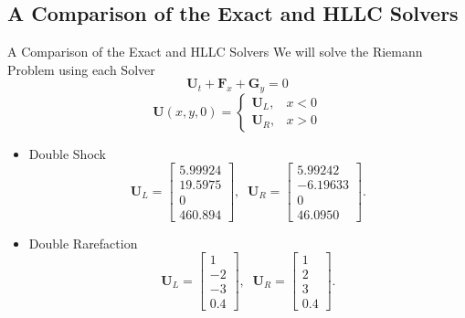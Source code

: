 \documentclass{beamer}
\newcommand{\mbf}{\mathbf}
\newcommand{\bq}{\begin{equation}}
\newcommand{\eq}{\end{equation}}
\begin{document}
\subsection{A Comparison of the Exact and HLLC Solvers}
\begin{frame}{A Comparison of the Exact and HLLC Solvers}
We will solve the Riemann Problem using each Solver
$$\mbf{U}_t+\mbf{F}_x+\mbf{G}_y=0$$
$$\mbf{U}(x,y,0)=\left\{\begin{array}{cc}\mbf{U}_L,&x<0\\ \mbf{U}_R,&x>0\end{array}\right.$$

\begin{itemize}
\item Double Shock
\bq \mbf{U}_L=\left[\begin{array}{c}5.99924\\ 19.5975\\ 0\\ 460.894\end{array}\right],\;\; \mbf{U}_R=\left[\begin{array}{c}5.99242\\ -6.19633 \\ 0\\ 46.0950\end{array}\right].\eq

\item Double Rarefaction
\bq \mbf{U}_L=\left[\begin{array}{c}1\\ -2\\ -3\\ 0.4\end{array}\right],\;\; \mbf{U}_R=\left[\begin{array}{c}1\\ 2 \\ 3\\ 0.4\end{array}\right].\eq
\end{itemize}
\end{frame}
\end{document}
